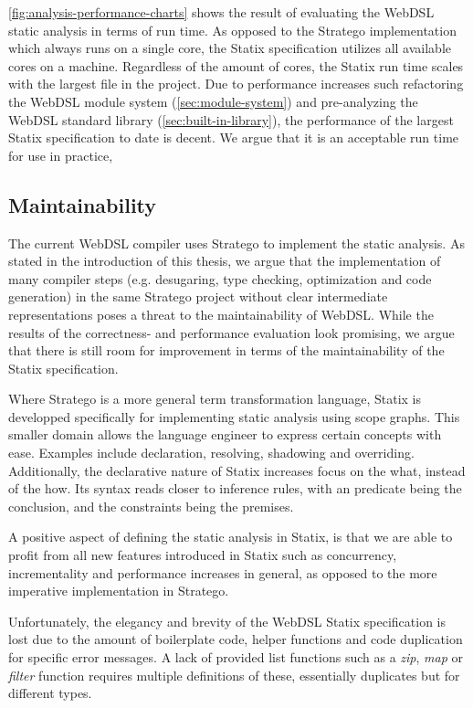     \cref{fig:analysis-performance-charts} shows the result of evaluating the WebDSL static analysis in terms of run time. As opposed to the Stratego implementation which always runs on a single core, the Statix specification utilizes all available cores on a machine. Regardless of the amount of cores, the Statix run time scales with the largest file in the project. Due to performance increases such refactoring the WebDSL module system (\cref{sec:module-system}) and pre-analyzing the WebDSL standard library (\cref{sec:built-in-library}), the performance of the largest Statix specification to date is decent. We argue that it is an acceptable run time for use in practice, 

  \subsection{Maintainability}

    The current WebDSL compiler uses Stratego to implement the static analysis. As stated in the introduction of this thesis, we argue that the implementation of many compiler steps (e.g. desugaring, type checking, optimization and code generation) in the same Stratego project without clear intermediate representations poses a threat to the maintainability of WebDSL. While the results of the correctness- and performance evaluation look promising, we argue that there is still room for improvement in terms of the maintainability of the Statix specification.
    
    Where Stratego is a more general term transformation language, Statix is developped specifically for implementing static analysis using scope graphs. This smaller domain allows the language engineer to express certain concepts with ease. Examples include declaration, resolving, shadowing and overriding. Additionally, the declarative nature of Statix increases focus on the what, instead of the how. Its syntax reads closer to inference rules, with an predicate being the conclusion, and the constraints being the premises.

    A positive aspect of defining the static analysis in Statix, is that we are able to profit from all new features introduced in Statix such as concurrency, incrementality and performance increases in general, as opposed to the more imperative implementation in Stratego.

    Unfortunately, the elegancy and brevity of the WebDSL Statix specification is lost due to the amount of boilerplate code, helper functions and code duplication for specific error messages. A lack of provided list functions such as a \textit{zip}, \textit{map} or \textit{filter} function requires multiple definitions of these, essentially duplicates but for different types.

